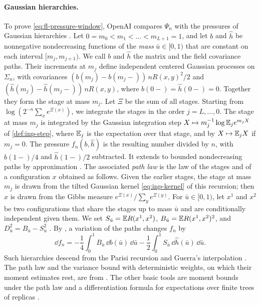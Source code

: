 \paragraph{Gaussian hierarchies.} To prove \eqref{eq:fl-pressure-window}, OpenAI compares $\Psi_n$ with the pressures of Gaussian hierarchies \cite[Section~2.1]{oai-fluctuations}. Let $0=m_0<m_1<\dots<m_{L+1}=1$, and let $b$ and ${\widehat h}$ be nonnegative nondecreasing functions of the \emph{mass} ${\bar u}\in[0,1)$ that are constant on each interval $[m_j,m_{j+1})$. We call $b$ and ${\widehat h}$ the matrix and the field covariance paths. Their increments at $m_j$ define independent centered Gaussian processes on $\Sigma_n$, with covariances $(b(m_j)-b(m_j-))\,nR(x,y)^2/2$ and $({\widehat h}(m_j)-{\widehat h}(m_j-))\,nR(x,y)$, where $b(0-)={\widehat h}(0-)=0$. Together they form the stage at mass $m_j$. Let $\Xi$ be the sum of all stages. Starting from $\log(2^{-n}\sum_xe^{\Xi(x)})$, we integrate the stages in the order $j=L,\dots,0$. The stage at mass $m_j$ is integrated by the Gaussian integration step $X\mapsto m_j^{-1}\log\mathbb E_je^{m_jX}$ of \cref{def:inp-step}, where $\mathbb E_j$ is the expectation over that stage, and by $X\mapsto\mathbb E_jX$ if $m_j=0$. The pressure $f_n(b,{\widehat h})$ is the resulting number divided by $n$, with $b(1-)/4$ and ${\widehat h}(1-)/2$ subtracted. It extends to bounded nondecreasing paths by approximation \cite[Proposition~2.14]{oai-fluctuations}. The associated \emph{path law} is the law of the stages and of a configuration $x$ obtained as follows. Given the earlier stages, the stage at mass $m_j$ is drawn from the tilted Gaussian kernel \eqref{eq:inp-kernel} of this recursion; then $x$ is drawn from the Gibbs measure $e^{\Xi(x)}/\sum_ye^{\Xi(y)}$. For ${\bar u}\in[0,1)$, let $x^1$ and $x^2$ be two configurations that share the stages up to mass ${\bar u}$ and are conditionally independent given them. We set $S_{\bar u}=\mathbb E R(x^1,x^2)$, $B_{\bar u}=\mathbb E R(x^1,x^2)^2$, and $D_{\bar u}^2=B_{\bar u}-S_{\bar u}^2$ \cite[Lemma~2.1]{oai-fluctuations}. By \cite[Lemma~2.2]{oai-fluctuations}, a variation of the paths changes $f_n$ by
\[
 \dd f_n=-\frac14\int_0^1B_{\bar u}\,\dd b({\bar u})\,\dd {\bar u}-\frac12\int_0^1S_{\bar u}\,\dd {\widehat h}({\bar u})\,\dd {\bar u}.
\]
Such hierarchies descend from the Parisi recursion and Guerra's interpolation \cite{parisi-1979,guerra-2003}. The path law and the variance bound with deterministic weights, on which their moment estimates rest, are from \cite[Section~2 and Proposition~2.2]{quantitative-parisi}. The other basic tools are moment bounds under the path law \cite[Lemma~2.3]{oai-fluctuations} and a differentiation formula for expectations over finite trees of replicas \cite[Proposition~2.5]{oai-fluctuations}.

